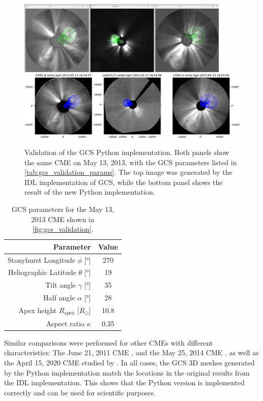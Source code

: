 \begin{figure}
	\centering
	\includegraphics[width=0.9\textwidth]{images/gcs_validation_20130513_idl.png}\\[5mm]
	\includegraphics[width=\textwidth]{images/gcs_validation_20130513_python.pdf}
	\caption[Validation of the GCS Python implementation]{Validation of the GCS Python implementation. Both panels show the same CME on May 13, 2013, with the GCS parameters listed in \autoref{tab:gcs_validation_params}. The top image was generated by the IDL implementation of GCS, while the bottom panel shows the result of the new Python implementation.}
	\label{fig:gcs_validation}
\end{figure}

\begin{table}
	\centering
	\begin{tabular}{rS[table-format=3.2]}
		\toprule
		                                  {Parameter} & {Value} \\ \midrule
		   Stonyhurst Longitude $\phi$ [\si{\degree}] & 270     \\
		Heliographic Latitude $\theta$ [\si{\degree}] & 19      \\
		           Tilt angle $\gamma$ [\si{\degree}] & 35      \\
		           Half angle $\alpha$ [\si{\degree}] & 28      \\
		      Apex height $R_\text{apex}$ [$R_\odot$] & 10.8    \\
		                        Aspect ratio $\kappa$ & 0.35    \\ \bottomrule
	\end{tabular}
	\caption[GCS parameters for \autoref{fig:gcs_validation}]{GCS parameters for the May 13, 2013 CME shown in \autoref{fig:gcs_validation}.}
	\label{tab:gcs_validation_params}
\end{table}

Similar comparisons were performed for other CMEs with different characteristics: The June 21, 2011 CME \citep[originally reconstructed by][Table 1]{Heinemann-2019}, and the May 25, 2014 CME \citep[originally reconstructed by][Figure 5b]{Dumbovic2018-ForbMod}, as well as the April 15, 2020 CME studied by \citet{Forstner-2021-SolO}. In all cases, the GCS 3D meshes generated by the Python implementation match the locations in the original results from the IDL implementation. This shows that the Python version is implemented correctly and can be used for scientific purposes.
